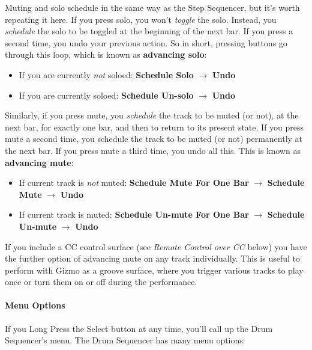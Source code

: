 \documentclass{article}
\begin{document}
Muting and solo schedule in the same way as the Step Sequencer, but it's worth repeating it here. If you press solo, you won't {\it toggle} the solo.  Instead, you {\it schedule} the solo to be toggled at the beginning of the next bar.  If you press a second time, you undo your previous action.  So in short, pressing buttons go through this loop, which is known as {\bf advancing solo}:

\begin{itemize}
\item If you are currently {\it not} soloed: {\bf Schedule Solo} \(\rightarrow\) {\bf Undo}
\item If you are currently soloed: {\bf Schedule Un-solo} \(\rightarrow\) {\bf Undo}
\end{itemize}

Similarly, if you press mute, you {\it schedule} the track to be muted (or not), at the next bar, for exactly one bar, and then to return to its present state.  If you press mute a second time, you schedule the track to be muted (or not) permanently at the next bar.  If you press mute a third time, you undo all this.  This is known as {\bf advancing mute}:

\begin{itemize}
\item If current track is {\it not} muted: {\bf Schedule Mute For One Bar} \(\rightarrow\)  {\bf Schedule Mute} \(\rightarrow\) {\bf Undo}
\item If current track is muted: {\bf Schedule Un-mute For One Bar} \(\rightarrow\)  {\bf Schedule Un-mute} \(\rightarrow\) {\bf Undo}
\end{itemize}

If you include a CC control surface (see {\it Remote Control over CC} below) you have the further option of advancing mute on any track individually.  This is useful to perform with Gizmo as a groove surface, where you trigger various tracks to play once or turn them on or off during the performance.


\paragraph{Menu Options}

If you Long Press the Select button at any time, you'll call up the Drum Sequencer's menu.  The Drum Sequencer has many menu options:
\end{document}
